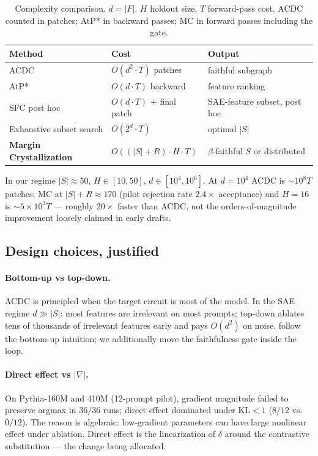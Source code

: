 \documentclass[10pt]{article}
\begin{document}
\begin{table}[t]
\centering
\small
\caption{Complexity comparison. $d = |F|$, $H$ holdout size, $T$ forward-pass cost. ACDC counted in patches; AtP* in backward passes; MC in forward passes including the gate.}
\label{tab:complexity}
\begin{tabular}{@{}lll@{}}
\toprule
Method & Cost & Output \\
\midrule
ACDC \citep{conmy2023acdc} & $O(d^2 \cdot T)$ patches & faithful subgraph \\
AtP* \citep{kramar2024atp} & $O(d \cdot T)$ backward & feature ranking \\
SFC post hoc \citep{marks2024sparse} & $O(d \cdot T)$ + final patch & SAE-feature subset, post hoc \\
Exhaustive subset search & $O(2^d \cdot T)$ & optimal $|S|$ \\
\textbf{Margin Crystallization} & $O((|S|+R) \cdot H \cdot T)$ & $\beta$-faithful $S$ or distributed \\
\bottomrule
\end{tabular}
\end{table}

In our regime $|S| \approx 50$, $H \in [10, 50]$, $d \in [10^4, 10^6]$. At $d = 10^4$ ACDC is $\sim 10^8 T$ patches; MC at $|S|+R \approx 170$ (pilot rejection rate $2.4\times$ acceptance) and $H = 16$ is $\sim 5 \times 10^3 T$ --- roughly $20\times$ faster than ACDC, not the orders-of-magnitude improvement loosely claimed in early drafts.

\subsection{Design choices, justified}

\paragraph{Bottom-up vs top-down.} ACDC \citep{conmy2023acdc} is principled when the target circuit is most of the model. In the SAE regime $d \gg |S|$: most features are irrelevant on most prompts; top-down ablates tens of thousands of irrelevant features early and pays $O(d^2)$ on noise. \citet{marks2024sparse} follow the bottom-up intuition; we additionally move the faithfulness gate inside the loop.

\paragraph{Direct effect vs $|\nabla|$.} On Pythia-160M and 410M (12-prompt pilot), gradient magnitude failed to preserve argmax in $36/36$ runs; direct effect dominated under KL$<1$ ($8/12$ vs.\ $0/12$). The reason is algebraic: low-gradient parameters can have large nonlinear effect under ablation. Direct effect is the linearization of $\delta$ around the contrastive substitution --- the change being allocated.
\end{document}
